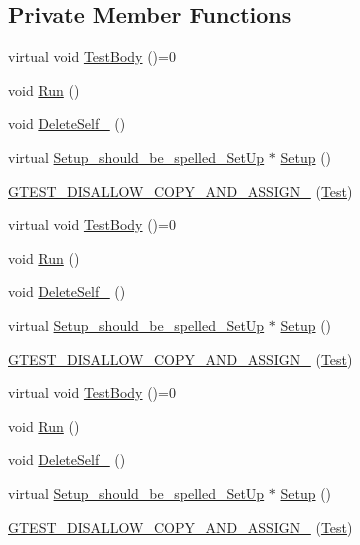 \subsection*{Private Member Functions}
\begin{DoxyCompactItemize}
\item 
virtual void \mbox{\hyperlink{classtesting_1_1_test_a146a4a5d9854e676d625a0ef67409794}{Test\+Body}} ()=0
\item 
void \mbox{\hyperlink{classtesting_1_1_test_ab70d07cb03d17ccb1aedc2be66eaccff}{Run}} ()
\item 
void \mbox{\hyperlink{classtesting_1_1_test_a3116f1f98ac889b11f1e3d981b8c6ca1}{Delete\+Self\+\_\+}} ()
\item 
virtual \mbox{\hyperlink{structtesting_1_1_test_1_1_setup__should__be__spelled___set_up}{Setup\+\_\+should\+\_\+be\+\_\+spelled\+\_\+\+Set\+Up}} $\ast$ \mbox{\hyperlink{classtesting_1_1_test_a65c1626d50b7dd1a1d759dc6c3f72d4c}{Setup}} ()
\item 
\mbox{\hyperlink{classtesting_1_1_test_a5d18da7437b0d6ca32dcad90a21f9b6b}{G\+T\+E\+S\+T\+\_\+\+D\+I\+S\+A\+L\+L\+O\+W\+\_\+\+C\+O\+P\+Y\+\_\+\+A\+N\+D\+\_\+\+A\+S\+S\+I\+G\+N\+\_\+}} (\mbox{\hyperlink{classtesting_1_1_test}{Test}})
\item 
virtual void \mbox{\hyperlink{classtesting_1_1_test_a146a4a5d9854e676d625a0ef67409794}{Test\+Body}} ()=0
\item 
void \mbox{\hyperlink{classtesting_1_1_test_a939ae280a6f2f1c3d43708ec616684ed}{Run}} ()
\item 
void \mbox{\hyperlink{classtesting_1_1_test_a3116f1f98ac889b11f1e3d981b8c6ca1}{Delete\+Self\+\_\+}} ()
\item 
virtual \mbox{\hyperlink{structtesting_1_1_test_1_1_setup__should__be__spelled___set_up}{Setup\+\_\+should\+\_\+be\+\_\+spelled\+\_\+\+Set\+Up}} $\ast$ \mbox{\hyperlink{classtesting_1_1_test_a65c1626d50b7dd1a1d759dc6c3f72d4c}{Setup}} ()
\item 
\mbox{\hyperlink{classtesting_1_1_test_a5d18da7437b0d6ca32dcad90a21f9b6b}{G\+T\+E\+S\+T\+\_\+\+D\+I\+S\+A\+L\+L\+O\+W\+\_\+\+C\+O\+P\+Y\+\_\+\+A\+N\+D\+\_\+\+A\+S\+S\+I\+G\+N\+\_\+}} (\mbox{\hyperlink{classtesting_1_1_test}{Test}})
\item 
virtual void \mbox{\hyperlink{classtesting_1_1_test_a146a4a5d9854e676d625a0ef67409794}{Test\+Body}} ()=0
\item 
void \mbox{\hyperlink{classtesting_1_1_test_a939ae280a6f2f1c3d43708ec616684ed}{Run}} ()
\item 
void \mbox{\hyperlink{classtesting_1_1_test_a3116f1f98ac889b11f1e3d981b8c6ca1}{Delete\+Self\+\_\+}} ()
\item 
virtual \mbox{\hyperlink{structtesting_1_1_test_1_1_setup__should__be__spelled___set_up}{Setup\+\_\+should\+\_\+be\+\_\+spelled\+\_\+\+Set\+Up}} $\ast$ \mbox{\hyperlink{classtesting_1_1_test_a65c1626d50b7dd1a1d759dc6c3f72d4c}{Setup}} ()
\item 
\mbox{\hyperlink{classtesting_1_1_test_a5d18da7437b0d6ca32dcad90a21f9b6b}{G\+T\+E\+S\+T\+\_\+\+D\+I\+S\+A\+L\+L\+O\+W\+\_\+\+C\+O\+P\+Y\+\_\+\+A\+N\+D\+\_\+\+A\+S\+S\+I\+G\+N\+\_\+}} (\mbox{\hyperlink{classtesting_1_1_test}{Test}})
\end{DoxyCompactItemize}
